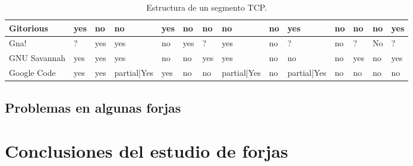 \begin{table}[H]
{\begin{tabular}{|l|l|l|l|l|l|l|l|l|l|l|l|l|l|}
    \hline Gitorious & yes & no & no & yes & no & no & no & no & yes & no & no & no & yes\\

    \hline Gna! & ?& yes& yes& no& yes& ?& yes& no& ?& no& ?& No& ?\\ 

    \hline GNU Savannah & yes & yes & yes & no & no & yes & yes & no & no & no & yes & no & yes\\

    \hline Google Code & yes & yes & partial|Yes & yes & no & no & partial|Yes & no & partial|Yes & no & no & no & no\\

    \hline
\end{tabular}
}
\caption{Estructura de un segmento TCP.}
\label{c2_tabla_segento_tcp}

\end{table}


\subsection{Problemas en algunas forjas}
\label{sub:problemas}


\section{Conclusiones del estudio de forjas}
\label{sec:conclusiones}

